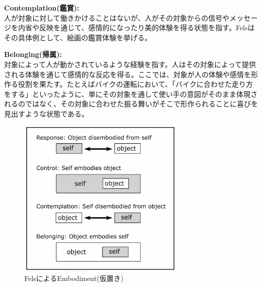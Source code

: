\textbf{Contemplation(鑑賞):}\\
人が対象に対して働きかけることはないが、人がその対象からの信号やメッセージを内省や反映を通じて、感情的になったり美的体験を得る状態を指す。Felsはその具体例として、絵画の鑑賞体験を挙げる。

\textbf{Belonging(帰属):}\\
対象によって人が動かされているような経験を指す。人はその対象によって提供される体験を通じて感情的な反応を得る。ここでは、対象が人の体験や感情を形作る役割を果たす。たとえばバイクの運転において、「バイクに合わせた走り方をする」といったように、単にその対象を通して使い手の意図がそのまま体現されるのではなく、その対象に合わせた振る舞いがそこで形作られることに喜びを見出すような状態である。

\begin{figure}[H]
  \centering
  \includegraphics[width=8cm]{img/fels_diagram.png}
  \caption{FelsによるEmbodiment(仮置き)}
  \label{fig:fels_embodiment}
\end{figure}



